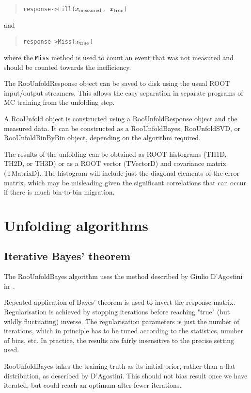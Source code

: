\documentclass{desyproc}
\begin{document}
\begin{quote}
\texttt{response->Fill($x_{\rm measured}$, $x_{\rm true}$)}
\end{quote}

and

\begin{quote}
\texttt{response->Miss($x_{\rm true}$)}
\end{quote}

where the \texttt{Miss} method is used to count an event that was not measured
and should be counted towards the inefficiency.

The RooUnfoldResponse object can be saved to disk using the usual ROOT input/output
streamers. This allows the easy separation in separate programs
of MC training from the unfolding step.

A RooUnfold object is constructed using a RooUnfoldResponse object and the measured
data. It can be constructed as a RooUnfoldBayes, RooUnfoldSVD, or RooUnfoldBinByBin
object, depending on the algorithm required.

The results of the unfolding can be obtained as ROOT histograms (TH1D, TH2D, or TH3D)
or as a ROOT vector (TVectorD) and covariance matrix (TMatrixD). The histogram will
include just the diagonal elements of the error matrix, which may be misleading
given the significant correlations that can occur if there is much bin-to-bin migration.

\section{Unfolding algorithms}

\subsection{Iterative Bayes' theorem}

The RooUnfoldBayes algorithm uses the method described by Giulio D'Agostini in~\cite{D'Agostini:1994zf}.

Repeated application of Bayes' theorem is used to invert the response matrix.
Regularisation is achieved by stopping iterations before reaching "true"
(but wildly fluctuating) inverse.
The regularisation parameters is just the number of iterations,
which in principle has to be tuned according to the statistics, number of bins, etc.
In practice, the results are fairly insensitive to the precise setting used.

RooUnfoldBayes takes the training truth as its initial prior, rather than a flat distribution,
as described by D'Agostini.
This should not bias result once we have iterated, but could reach an optimum after fewer iterations.
\end{document}

